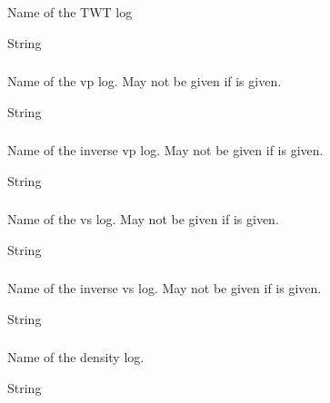 \subsubsection{} 
 \slist
   \item \Description Name of the TWT log
   \item \Argument String
   \item \Default %
 \elist

\subsubsection{}
 \slist
   \item \Description Name of the vp log. May not be given if  is given.
   \item \Argument String
   \item \Default
 \elist

\subsubsection{}
 \slist
   \item \Description Name of the inverse vp log. May not be given if  is given.
   \item \Argument String
   \item \Default %
 \elist

\subsubsection{}
 \slist
   \item \Description Name of the vs log. May not be given if  is given.
   \item \Argument String
   \item \Default
 \elist

\subsubsection{}
 \slist
   \item \Description Name of the inverse vs log. May not be given if  is given.
   \item \Argument String
   \item \Default %
 \elist

\subsubsection{}
 \slist
   \item \Description Name of the density log.
   \item \Argument String
   \item \Default %
 \elist

